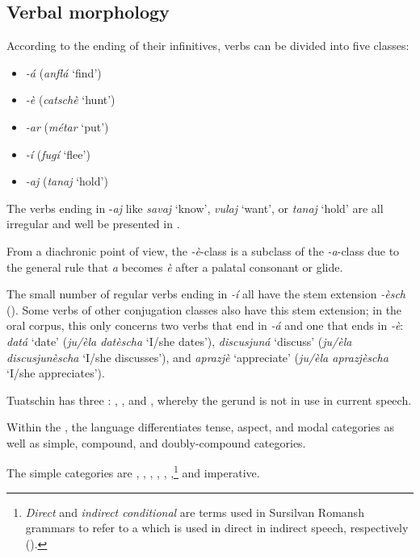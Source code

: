 \subsection{Verbal morphology}\label{sec:4.1.1}
According to the ending of their infinitives, verbs can be divided into five classes:

\begin{itemize}

\item \textit{-á} (\textit{anflá} `find')
\item \textit{-è} (\textit{catschè} `hunt')
\item \textit{-ar} (\textit{métar} `put')
\item \textit{-í} (\textit{fugí} `flee')
\item  \textit{-aj} (\textit{tanaj} `hold')
\end{itemize}

The verbs ending in -\textit{aj} like \textit{savaj} `know', \textit{vulaj} `want', or \textit{tanaj} `hold'  are all irregular and well be presented in .

From a diachronic point of view, the \textit{-è}-class is a subclass of the \textit{-a}-class due to the general rule that \textit{a} becomes \textit{è} after a palatal consonant or glide.

The small number of regular verbs ending in \textit{-í} all have the stem extension \textit{-èsch} (). Some verbs of other conjugation classes also have this stem extension; in the oral corpus, this only concerns two verbs that end in \textit{-á} and one that ends in \textit{-è}: \textit{datá} `date' (\textit{ju/èla datèscha} `I/she dates'), \textit{discusjuná} `discuss' (\textit{ju/èla discusjunèscha} `I/she discusses'), and \textit{aprazjè} `appreciate' (\textit{ju/èla aprazjè\-scha} `I/she appreciates').

Tuatschin has three : , , and , whereby the ger\-und is not in use in current speech.

Within the , the language differentiates tense, aspect, and modal categories as well as simple,  compound, and doubly-compound categories.

The simple categories are , , , , , ,\footnote{\textit{Direct} and \textit{indirect conditional} are terms used in Sursilvan Romansh grammars to refer to a  which is used in direct in indirect speech, respectively  ().} and imperative.

